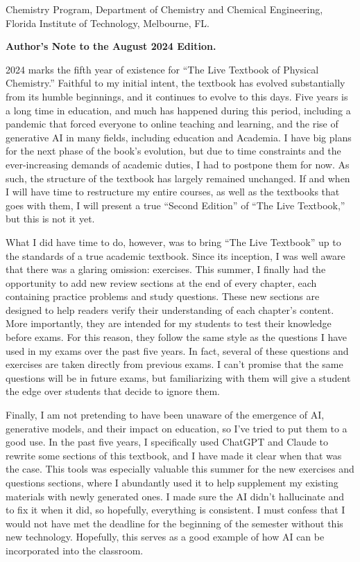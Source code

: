 \documentclass[
  9pt,
]{extbook}
\theoremstyle{definition}
\theoremstyle{definition}
\theoremstyle{definition}
\theoremstyle{remark}
\begin{document}
Chemistry Program, Department of Chemistry and Chemical Engineering,
Florida Institute of Technology, Melbourne, FL.

\textbf{Author's Note to the August 2024 Edition.}

2024 marks the fifth year of existence for ``The Live Textbook of Physical Chemistry.'' Faithful to my initial intent, the textbook has evolved substantially from its humble beginnings, and it continues to evolve to this days. Five years is a long time in education, and much has happened during this period, including a pandemic that forced everyone to online teaching and learning, and the rise of generative AI in many fields, including education and Academia. I have big plans for the next phase of the book's evolution, but due to time constraints and the ever-increasing demands of academic duties, I had to postpone them for now. As such, the structure of the textbook has largely remained unchanged. If and when I will have time to restructure my entire courses, as well as the textbooks that goes with them, I will present a true ``Second Edition'' of ``The Live Textbook,'' but this is not it yet.

What I did have time to do, however, was to bring ``The Live Textbook'' up to the standards of a true academic textbook. Since its inception, I was well aware that there was a glaring omission: exercises. This summer, I finally had the opportunity to add new review sections at the end of every chapter, each containing practice problems and study questions. These new sections are designed to help readers verify their understanding of each chapter's content. More importantly, they are intended for my students to test their knowledge before exams. For this reason, they follow the same style as the questions I have used in my exams over the past five years. In fact, several of these questions and exercises are taken directly from previous exams. I can't promise that the same questions will be in future exams, but familiarizing with them will give a student the edge over students that decide to ignore them.

Finally, I am not pretending to have been unaware of the emergence of AI, generative models, and their impact on education, so I've tried to put them to a good use. In the past five years, I specifically used ChatGPT and Claude to rewrite some sections of this textbook, and I have made it clear when that was the case. This tools was especially valuable this summer for the new exercises and questions sections, where I abundantly used it to help supplement my existing materials with newly generated ones. I made sure the AI didn't hallucinate and to fix it when it did, so hopefully, everything is consistent. I must confess that I would not have met the deadline for the beginning of the semester without this new technology. Hopefully, this serves as a good example of how AI can be incorporated into the classroom.
\end{document}
